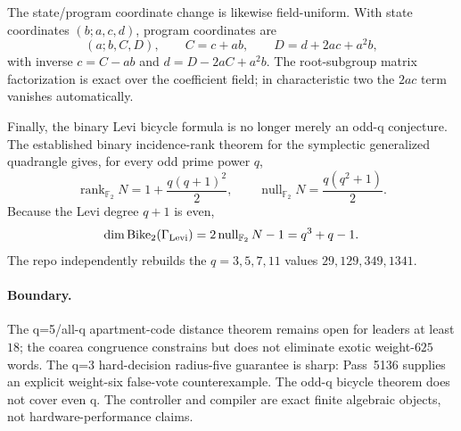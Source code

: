 The state/program coordinate change is likewise field-uniform.  With state coordinates $(b;a,c,d)$, program coordinates are
\[
 (a;b,C,D),\qquad C=c+ab,\qquad D=d+2ac+a^2b,
\]
with inverse $c=C-ab$ and $d=D-2aC+a^2b$.  The root-subgroup matrix factorization is exact over the coefficient field; in characteristic two the $2ac$ term vanishes automatically.

Finally, the binary Levi bicycle formula is no longer merely an odd-q conjecture.  The established binary incidence-rank theorem for the symplectic generalized quadrangle gives, for every odd prime power $q$,
\[
 \operatorname{rank}_{\mathbb F_2}N=1+\frac{q(q+1)^2}{2},\qquad
 \operatorname{null}_{\mathbb F_2}N=\frac{q(q^2+1)}2.
\]
Because the Levi degree $q+1$ is even,
\[
 \dim\operatorname{Bike}_2(\Gamma_{\rm Levi})=2\operatorname{null}_{\mathbb F_2}N-1=q^3+q-1.
\]
The repo independently rebuilds the $q=3,5,7,11$ values $29,129,349,1341$.

\paragraph{Boundary.}
The q=5/all-q apartment-code distance theorem remains open for leaders at least $18$; the coarea congruence constrains but does not eliminate exotic weight-$625$ words.  The q=3 hard-decision radius-five guarantee is sharp: Pass~5136 supplies an explicit weight-six false-vote counterexample.  The odd-q bicycle theorem does not cover even q.  The controller and compiler are exact finite algebraic objects, not hardware-performance claims.
%
\fi
